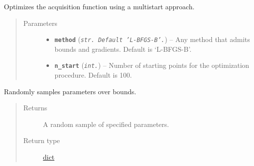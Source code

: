 \documentclass[letterpaper,10pt,english]{sphinxmanual}
\begin{document}
\begin{fulllineitems}
\begin{fulllineitems}
\begin{quote}
\begin{description}
\end{description}\end{quote}

\end{fulllineitems}


\begin{fulllineitems}
\label{pyGPGO.GPGO:pyGPGO.GPGO.GPGO._optimizeAcq}
Optimizes the acquisition function using a multistart approach.
\begin{quote}\begin{description}
\item[{Parameters}] \leavevmode\begin{itemize}
\item {} 
\textbf{\texttt{method}} (\emph{\texttt{str. Default 'L-BFGS-B'.}}) -- Any  method that admits bounds and gradients. Default is `L-BFGS-B'.

\item {} 
\textbf{\texttt{n\_start}} (\emph{\texttt{int.}}) -- Number of starting points for the optimization procedure. Default is 100.

\end{itemize}

\end{description}\end{quote}

\end{fulllineitems}


\begin{fulllineitems}
\label{pyGPGO.GPGO:pyGPGO.GPGO.GPGO._sampleParam}
Randomly samples parameters over bounds.
\begin{quote}\begin{description}
\item[{Returns}] \leavevmode
A random sample of specified parameters.

\item[{Return type}] \leavevmode
\href{https://docs.python.org/2/library/stdtypes.html\#dict}{dict}

\end{description}\end{quote}


\end{fulllineitems}
\end{fulllineitems}
\end{document}
